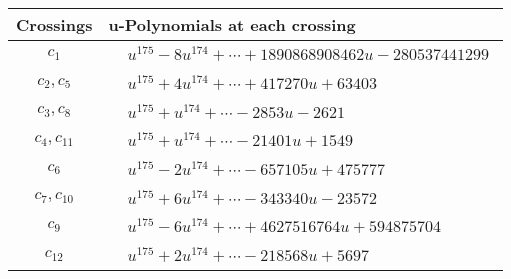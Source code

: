 \documentclass[1p]{elsarticle_modified}
\theoremstyle{definition}
\begin{document}
\begin{tabular}{m{50pt}|m{274pt}}
Crossings & \hspace{64pt}u-Polynomials at each crossing \\
\hline $$\begin{aligned}c_{1}\end{aligned}$$&$\begin{aligned}
&u^{175}-8 u^{174}+\cdots+1890868908462 u-280537441299
\end{aligned}$\\
\hline $$\begin{aligned}c_{2},c_{5}\end{aligned}$$&$\begin{aligned}
&u^{175}+4 u^{174}+\cdots+417270 u+63403
\end{aligned}$\\
\hline $$\begin{aligned}c_{3},c_{8}\end{aligned}$$&$\begin{aligned}
&u^{175}+u^{174}+\cdots-2853 u-2621
\end{aligned}$\\
\hline $$\begin{aligned}c_{4},c_{11}\end{aligned}$$&$\begin{aligned}
&u^{175}+u^{174}+\cdots-21401 u+1549
\end{aligned}$\\
\hline $$\begin{aligned}c_{6}\end{aligned}$$&$\begin{aligned}
&u^{175}-2 u^{174}+\cdots-657105 u+475777
\end{aligned}$\\
\hline $$\begin{aligned}c_{7},c_{10}\end{aligned}$$&$\begin{aligned}
&u^{175}+6 u^{174}+\cdots-343340 u-23572
\end{aligned}$\\
\hline $$\begin{aligned}c_{9}\end{aligned}$$&$\begin{aligned}
&u^{175}-6 u^{174}+\cdots+4627516764 u+594875704
\end{aligned}$\\
\hline $$\begin{aligned}c_{12}\end{aligned}$$&$\begin{aligned}
&u^{175}+2 u^{174}+\cdots-218568 u+5697
\end{aligned}$\\
\hline
\end{tabular}\\~\\
\end{document}
